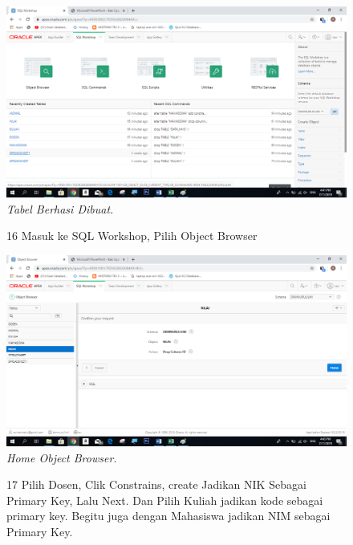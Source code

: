 \begin{enumerate}
\begin{figure}
    \begin{center}
    \includegraphics[scale=0.6]{figures/15.png}
    \caption{\textit{Tabel Berhasi Dibuat.}}
    \end{center}
    \label{gambar}
    \end{figure}

\begin{figure}
\item[16]Masuk ke SQL Workshop, Pilih Object Browser

    \begin{center}
    \includegraphics[scale=0.6]{figures/17.png}
    \caption{\textit{Home Object Browser.}}
    \end{center}
    \label{gambar}
    \end{figure}
    
\begin{figure}
\item[17]Pilih Dosen, Clik Constrains, create Jadikan NIK Sebagai Primary Key, Lalu Next. Dan Pilih Kuliah jadikan kode sebagai primary key. Begitu juga dengan Mahasiswa jadikan NIM sebagai Primary Key.


\end{figure}
\end{enumerate}
